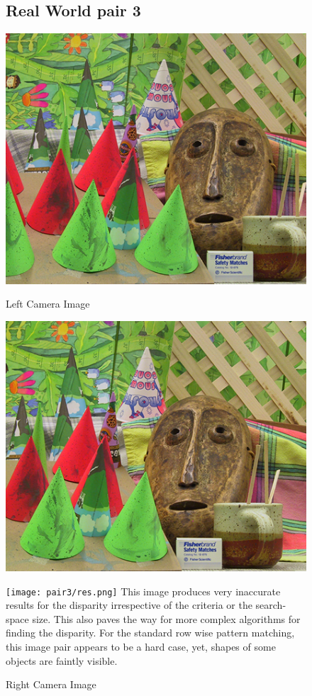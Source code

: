 \documentclass[12pt]{article}
\begin{document}
  

 
  \begin{figure}[!htb]
  \subsection{Real World pair 3}
    \centering
    \begin{minipage}{.5\textwidth}
        \centering
        \includegraphics[width=0.7\linewidth]{pair3/im_l.png}
        \caption{Left Camera Image }
        \label{fig:5}
    \end{minipage}%
    \begin{minipage}{0.5\textwidth}
        \centering
        \includegraphics[width=0.7\linewidth]{pair3/im_r.png}
        \caption{Right Camera Image}
        \label{fig:6}
    \end{minipage}
      
      \texttt{[image: pair3/res.png]}
      This image produces very inaccurate results for the disparity irrespective of the criteria or the search-space size. This also paves the way for more complex algorithms for finding the disparity. For the standard row wise pattern matching, this image pair appears to be a hard case, yet, shapes of some objects are faintly visible.
    \end{figure}
 
\end{document}

